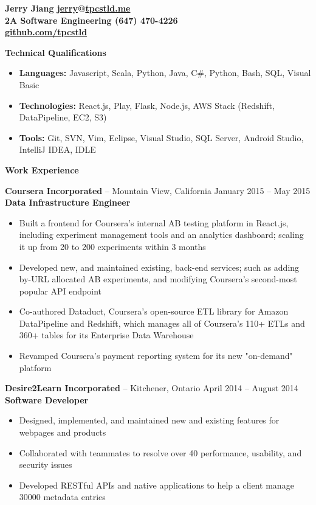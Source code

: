 \documentclass{letter}
\begin{document}
{\bfseries
  {\Large Jerry Jiang} \hfill \href{mailto:jerry@tpcstld.me}{jerry}@\href{//tpcstld.me}{tpcstld.me} \\
  2A Software Engineering \hfill (647) 470-4226 \\
  \null \hfill \href{https://github.com/tpcstld}{github.com/tpcstld}} \\
\null \hrulefill

{\bfseries \Large Technical Qualifications}
\vspace{-3mm}
\begin{itemize}
    \item {\bfseries Languages:}
        Javascript, Scala, Python, Java, C\#, Python, Bash, SQL, Visual Basic
    \item {\bfseries Technologies:}
        React.js, Play, Flask, Node.js, AWS Stack (Redshift, DataPipeline, EC2, S3)
    \item {\bfseries Tools:}
        Git, SVN, Vim, Eclipse, Visual Studio, SQL Server, Android Studio, IntelliJ IDEA, IDLE
\end{itemize}

{\bfseries \Large Work Experience}

\vspace{-1.5mm}
{\bfseries Coursera Incorporated} -- Mountain View, California \hfill January 2015 -- May 2015 \\
{\bfseries Data Infrastructure Engineer}
\vspace{-3mm}
\begin{itemize}
    \item Built a frontend for Coursera's internal AB testing platform in React.js, including
      experiment management tools and an analytics dashboard; scaling it up from 20 to
      200 experiments within 3 months
    \item Developed new, and maintained existing, back-end services; such as adding by-URL allocated
      AB experiments, and modifying Coursera's second-most popular API endpoint
    \item Co-authored Dataduct, Coursera's open-source ETL library for Amazon DataPipeline and
      Redshift, which manages all of Coursera's 110+ ETLs and 360+ tables for its Enterprise Data Warehouse
    \item Revamped Coursera's payment reporting system for its new "on-demand" platform
\end{itemize}

\vspace{-1.5mm}
{\bfseries Desire2Learn Incorporated} -- Kitchener, Ontario \hfill April 2014 -- August 2014 \\
{\bfseries Software Developer}
\vspace{-3mm}
\begin{itemize}
    \item Designed, implemented, and maintained new and existing features for webpages and products
    \item Collaborated with teammates to resolve over 40 performance, usability, and security issues
    \item Developed RESTful APIs and native applications to help a client manage 30000 metadata entries
\end{itemize}
\end{document}
